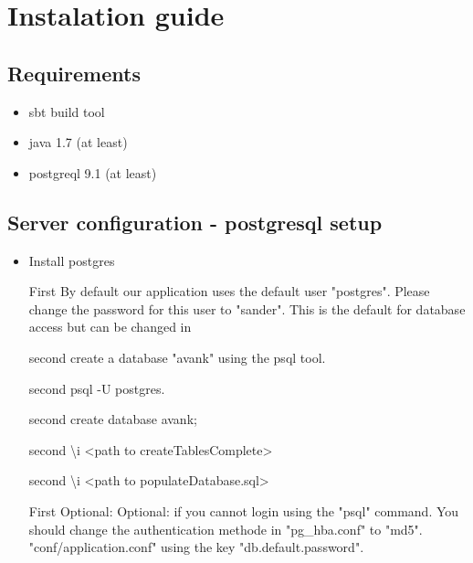 \documentclass[11pt]{article}
\date{}
\begin{document}
\section{Instalation guide}
\subsection{Requirements}
\begin{itemize}
\item sbt build tool
\item java 1.7 (at least)
\item postgreql 9.1 (at least)
\end{itemize}

\subsection{Server configuration - postgresql setup}
\begin{itemize}
\item Install postgres
\item[First] By default our application uses the default user "postgres". Please change the password for this user to "sander". This is the default for database access but can be changed in
\item[second] create a database "avank" using the psql tool.
\item[second] psql -U postgres.
\item[second] create database avank;
\item[second] \textbackslash i <path to createTablesComplete>
\item[second] \textbackslash i <path to populateDatabase.sql>
\item[First] Optional: Optional: if you cannot login using the "psql" command. You should change the authentication methode in "pg\_hba.conf" to "md5". 
"conf/application.conf" using the key "db.default.password".
\end{itemize}
\end{document}
